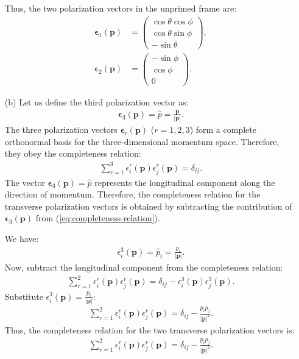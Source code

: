 \begin{enumerate}
Thus, the two polarization vectors in the unprimed frame are:
\begin{align}
    \boldsymbol{\epsilon}_1(\mathbf{p}) &= 
    \begin{pmatrix}
        \cos \theta \cos \phi \\
        \cos \theta \sin \phi \\
        -\sin \theta
    \end{pmatrix}, \\
    \boldsymbol{\epsilon}_2(\mathbf{p}) &= 
    \begin{pmatrix}
        -\sin \phi \\
        \cos \phi \\
        0
    \end{pmatrix}.
\end{align}
\item [(b)] Let us define the third polarization vector as:
\begin{align}
    \boldsymbol{\epsilon}_3(\mathbf{p}) = \hat{p} = \frac{\mathbf{p}}{|\mathbf{p}|}.
\end{align}
The three polarization vectors $\boldsymbol{\epsilon}_r(\mathbf{p})$ ($r = 1, 2, 3$) form a complete orthonormal basis for the three-dimensional momentum space. Therefore, they obey the completeness relation:
\begin{align}
    \sum_{r=1}^3 \epsilon_i^r(\mathbf{p}) \epsilon_j^r(\mathbf{p}) = \delta_{ij}. \label{eq:completeness-relation}
\end{align}
The vector $\displaystyle \boldsymbol{\epsilon}_3(\mathbf{p}) = \hat{p}$ represents the longitudinal component along the direction of momentum. Therefore, the completeness relation for the transverse polarization vectors is obtained by subtracting the contribution of $\boldsymbol{\epsilon}_3(\mathbf{p})$ from (\ref{eq:completeness-relation}).

We have:
\begin{align*}
    \epsilon_i^3(\mathbf{p}) = \hat{p}_i = \frac{p_i}{|\mathbf{p}|}.
\end{align*}
Now, subtract the longitudinal component from the completeness relation:
\begin{align*}
    \sum_{r=1}^2 \epsilon_i^r(\mathbf{p}) \epsilon_j^r(\mathbf{p}) = \delta_{ij} - \epsilon_i^3(\mathbf{p}) \epsilon_j^3(\mathbf{p}).
\end{align*}
Substitute $\displaystyle\epsilon_i^3(\mathbf{p}) = \frac{p_i}{|\mathbf{p}|}$:
\begin{align*}
    \sum_{r=1}^2 \epsilon_i^r(\mathbf{p}) \epsilon_j^r(\mathbf{p}) = \delta_{ij} - \frac{p_i p_j}{|\mathbf{p}|^2}.
\end{align*}
Thus, the completeness relation for the two transverse polarization vectors is:
\begin{align}
    \sum_{r=1}^2 \epsilon_i^r(\mathbf{p}) \epsilon_j^r(\mathbf{p}) = \delta_{ij} - \frac{p_i p_j}{|\mathbf{p}|^2}.
\end{align}
\end{enumerate}
\bigskip\bigskip\hline\hline\bigskip